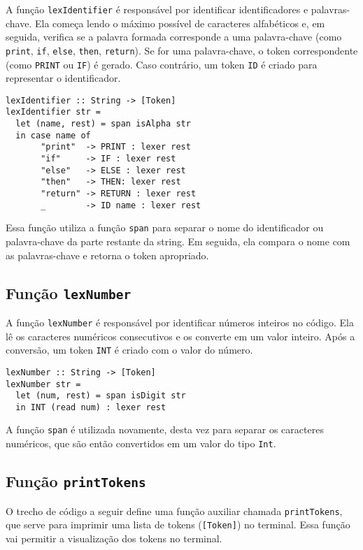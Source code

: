 \documentclass{article}
\begin{document}
A função \texttt{lexIdentifier} é responsável por identificar identificadores e palavras-chave. Ela começa lendo o máximo possível de caracteres alfabéticos e, em seguida, verifica se a palavra formada corresponde a uma palavra-chave (como \texttt{print}, \texttt{if}, \texttt{else}, \texttt{then}, \texttt{return}). Se for uma palavra-chave, o token correspondente (como \texttt{PRINT} ou \texttt{IF}) é gerado. Caso contrário, um token \texttt{ID} é criado para representar o identificador.

\begin{verbatim}
lexIdentifier :: String -> [Token]
lexIdentifier str =
  let (name, rest) = span isAlpha str
  in case name of
       "print"  -> PRINT : lexer rest
       "if"     -> IF : lexer rest
       "else"   -> ELSE : lexer rest
       "then"   -> THEN: lexer rest
       "return" -> RETURN : lexer rest
       _        -> ID name : lexer rest
\end{verbatim}

Essa função utiliza a função \texttt{span} para separar o nome do identificador ou palavra-chave da parte restante da string. Em seguida, ela compara o nome com as palavras-chave e retorna o token apropriado.

\subsection{Função \texttt{lexNumber}}

A função \texttt{lexNumber} é responsável por identificar números inteiros no código. Ela lê os caracteres numéricos consecutivos e os converte em um valor inteiro. Após a conversão, um token \texttt{INT} é criado com o valor do número.

\begin{verbatim}
lexNumber :: String -> [Token]
lexNumber str =
  let (num, rest) = span isDigit str
  in INT (read num) : lexer rest
\end{verbatim}

A função \texttt{span} é utilizada novamente, desta vez para separar os caracteres numéricos, que são então convertidos em um valor do tipo \texttt{Int}.

\subsection{Função \texttt{printTokens}}

O trecho de código a seguir define uma função auxiliar chamada \texttt{printTokens}, que serve para imprimir uma lista de tokens (\texttt{[Token]}) no terminal. Essa função vai permitir a visualização dos tokens no terminal.
\end{document}
